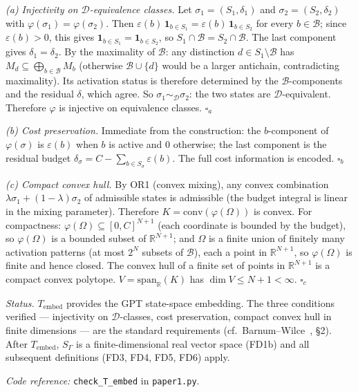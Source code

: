 \documentclass[11pt]{article}
\theoremstyle{remark}
\newcommand{\coderef}[2]{\smallskip\noindent\textit{Code reference:} \texttt{#1} in \texttt{#2}.}
\begin{document}
\begin{tcolorbox}[apfbox, title={Theorem $T_{\mathrm{embed}}$ (Canonical Embedding): FD1a $\to$ FD1b}]
\textit{(a) Injectivity on $\mathcal{D}$-equivalence classes.}  Let $\sigma_1 = (S_1, \delta_1)$ and $\sigma_2 = (S_2, \delta_2)$ with $\varphi(\sigma_1) = \varphi(\sigma_2)$.  Then $\varepsilon(b)\,\mathbf{1}_{b \in S_1} = \varepsilon(b)\,\mathbf{1}_{b \in S_2}$ for every $b \in \mathcal{B}$; since $\varepsilon(b) > 0$, this gives $\mathbf{1}_{b \in S_1} = \mathbf{1}_{b \in S_2}$, so $S_1 \cap \mathcal{B} = S_2 \cap \mathcal{B}$.  The last component gives $\delta_1 = \delta_2$.  By the maximality of $\mathcal{B}$: any distinction $d \in S_1 \setminus \mathcal{B}$ has $M_d \subseteq \bigoplus_{b \in \mathcal{B}} M_b$ (otherwise $\mathcal{B} \cup \{d\}$ would be a larger antichain, contradicting maximality).  Its activation status is therefore determined by the $\mathcal{B}$-components and the residual $\delta$, which agree.  So $\sigma_1 \sim_\mathcal{D} \sigma_2$: the two states are $\mathcal{D}$-equivalent.  Therefore $\varphi$ is injective on equivalence classes.  \hfill$\square_a$

\textit{(b) Cost preservation.}  Immediate from the construction: the $b$-component of $\varphi(\sigma)$ is $\varepsilon(b)$ when $b$ is active and $0$ otherwise; the last component is the residual budget $\delta_\sigma = C - \sum_{b \in S_\sigma} \varepsilon(b)$.  The full cost information is encoded.  \hfill$\square_b$

\textit{(c) Compact convex hull.}  By OR1 (convex mixing), any convex combination $\lambda\sigma_1 + (1{-}\lambda)\sigma_2$ of admissible states is admissible (the budget integral is linear in the mixing parameter).  Therefore $K = \mathrm{conv}(\varphi(\Omega))$ is convex.  For compactness: $\varphi(\Omega) \subseteq [0, C]^{N+1}$ (each coordinate is bounded by the budget), so $\varphi(\Omega)$ is a bounded subset of $\mathbb{R}^{N+1}$; and $\Omega$ is a finite union of finitely many activation patterns (at most $2^N$ subsets of $\mathcal{B}$), each a point in $\mathbb{R}^{N+1}$, so $\varphi(\Omega)$ is finite and hence closed.  The convex hull of a finite set of points in $\mathbb{R}^{N+1}$ is a compact convex polytope.  $V = \mathrm{span}_\mathbb{R}(K)$ has $\dim V \leq N + 1 < \infty$.  \hfill$\square_c$

\smallskip\noindent\textit{Status.}  $T_{\mathrm{embed}}$ provides the GPT state-space embedding.  The three conditions verified --- injectivity on $\mathcal{D}$-classes, cost preservation, compact convex hull in finite dimensions --- are the standard requirements (cf.\ Barnum--Wilce~\cite{BarnumWilce2012}, \S2).  After $T_{\mathrm{embed}}$, $S_\Gamma$ is a finite-dimensional real vector space (FD1b) and all subsequent definitions (FD3, FD4, FD5, FD6) apply.

\coderef{check\_T\_embed}{paper1.py}
\end{tcolorbox}
\end{document}
